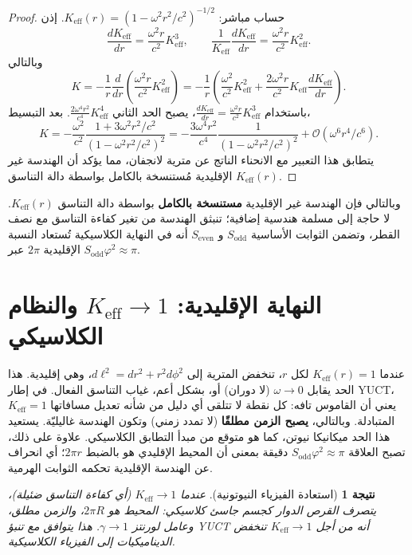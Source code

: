 \documentclass[12pt,a4paper]{article}
\newtheorem{corollary}{نتيجة}[section]
\newcommand{\Sodd}{S_{\mathrm{odd}}}
\newcommand{\Seven}{S_{\mathrm{even}}}
\begin{document}
	\begin{proof}
		حساب مباشر: \(K_{\mathrm{eff}}(r) = (1 - \omega^2 r^2/c^2)^{-1/2}\). إذن
		\[
		\frac{dK_{\mathrm{eff}}}{dr} = \frac{\omega^2 r}{c^2} K_{\mathrm{eff}}^3,\qquad
		\frac{1}{K_{\mathrm{eff}}} \frac{dK_{\mathrm{eff}}}{dr} = \frac{\omega^2 r}{c^2} K_{\mathrm{eff}}^2.
		\]
		وبالتالي
		\[
		K = -\frac{1}{r} \frac{d}{dr}\left( \frac{\omega^2 r}{c^2} K_{\mathrm{eff}}^2 \right) = -\frac{1}{r} \left( \frac{\omega^2}{c^2} K_{\mathrm{eff}}^2 + \frac{2\omega^2 r}{c^2} K_{\mathrm{eff}} \frac{dK_{\mathrm{eff}}}{dr} \right).
		\]
		باستخدام \(\frac{dK_{\mathrm{eff}}}{dr} = \frac{\omega^2 r}{c^2} K_{\mathrm{eff}}^3\)، يصبح الحد الثاني \(\frac{2\omega^4 r^2}{c^4} K_{\mathrm{eff}}^4\). بعد التبسيط،
		\[
		K = -\frac{\omega^2}{c^2} \frac{1 + 3\omega^2 r^2/c^2}{(1 - \omega^2 r^2/c^2)^2} = -\frac{3\omega^4 r^2}{c^4} \frac{1}{(1 - \omega^2 r^2/c^2)^2} + \mathcal{O}(\omega^6 r^4/c^6).
		\]
		يتطابق هذا التعبير مع الانحناء الناتج عن مترية لانجفان، مما يؤكد أن الهندسة غير الإقليدية مُستنسخة بالكامل بواسطة دالة التناسق \(K_{\mathrm{eff}}(r)\).
	\end{proof}
	
	وبالتالي فإن الهندسة غير الإقليدية \textbf{مستنسخة بالكامل} بواسطة دالة التناسق \(K_{\mathrm{eff}}(r)\). لا حاجة إلى مسلمة هندسية إضافية؛ تنبثق الهندسة من تغير كفاءة التناسق مع نصف القطر، وتضمن الثوابت الأساسية \(\Sodd\) و \(\Seven\) أنه في النهاية الكلاسيكية تُستعاد النسبة الإقليدية \(2\pi\) عبر \(\Sodd \varphi^2 \approx \pi\).
	
	\section{النهاية الإقليدية: \(K_{\mathrm{eff}} \to 1\) والنظام الكلاسيكي}
	\label{sec:euc-limit}
	
	عندما \(K_{\mathrm{eff}}(r) = 1\) لكل \(r\)، تنخفض المترية إلى \(d\ell^2 = dr^2 + r^2 d\phi^2\)، وهي إقليدية. هذا الحد يقابل \(\omega \to 0\) (لا دوران) أو، بشكل أعم، غياب التناسق الفعال. في إطار YUCT، \(K_{\mathrm{eff}} = 1\) يعني أن القاموس تافه: كل نقطة لا تتلقى أي دليل من شأنه تعديل مسافاتها المتبادلة. وبالتالي، \textbf{يصبح الزمن مطلقًا} (لا تمدد زمني) وتكون الهندسة غاليليّة. يستعيد هذا الحد ميكانيكا نيوتن، كما هو متوقع من مبدأ التطابق الكلاسيكي. علاوة على ذلك، تصبح العلاقة \(\Sodd \varphi^2 \approx \pi\) دقيقة بمعنى أن المحيط الإقليدي هو بالضبط \(2\pi r\)؛ أي انحراف عن الهندسة الإقليدية تحكمه الثوابت الهرمية.
	
	\begin{corollary}[استعادة الفيزياء النيوتونية]
		عندما \(K_{\mathrm{eff}} \to 1\) (أي كفاءة التناسق ضئيلة)، يتصرف القرص الدوار كجسم جاسئ كلاسيكي: المحيط هو \(2\pi R\)، والزمن مطلق، وعامل لورنتز \(\gamma \to 1\). هذا يتوافق مع تنبؤ YUCT أنه من أجل \(K_{\mathrm{eff}} \to 1\) تنخفض الديناميكيات إلى الفيزياء الكلاسيكية.
	\end{corollary}
	
\end{document}
